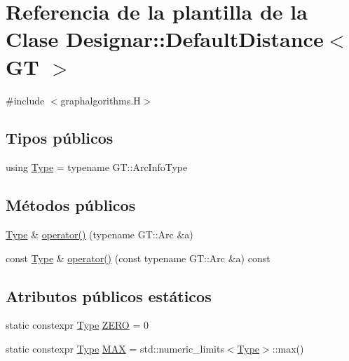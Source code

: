 \hypertarget{class_designar_1_1_default_distance}{}\section{Referencia de la plantilla de la Clase Designar\+:\+:Default\+Distance$<$ GT $>$}
\label{class_designar_1_1_default_distance}


{\ttfamily \#include $<$graphalgorithms.\+H$>$}

\subsection*{Tipos públicos}
\begin{DoxyCompactItemize}
\item 
using \hyperlink{class_designar_1_1_default_distance_a9317a5edf566779550b96edd532b502b}{Type} = typename G\+T\+::\+Arc\+Info\+Type
\end{DoxyCompactItemize}
\subsection*{Métodos públicos}
\begin{DoxyCompactItemize}
\item 
\hyperlink{class_designar_1_1_default_distance_a9317a5edf566779550b96edd532b502b}{Type} \& \hyperlink{class_designar_1_1_default_distance_ac601666aabb51229c4ceff72cd7d82db}{operator()} (typename G\+T\+::\+Arc \&a)
\item 
const \hyperlink{class_designar_1_1_default_distance_a9317a5edf566779550b96edd532b502b}{Type} \& \hyperlink{class_designar_1_1_default_distance_aeba8bd2867faf7d86dd0bcae6b690136}{operator()} (const typename G\+T\+::\+Arc \&a) const
\end{DoxyCompactItemize}
\subsection*{Atributos públicos estáticos}
\begin{DoxyCompactItemize}
\item 
static constexpr \hyperlink{class_designar_1_1_default_distance_a9317a5edf566779550b96edd532b502b}{Type} \hyperlink{class_designar_1_1_default_distance_abee3d9a2a3f573d6844c0a0fdbd4d7ac}{Z\+E\+RO} = 0
\item 
static constexpr \hyperlink{class_designar_1_1_default_distance_a9317a5edf566779550b96edd532b502b}{Type} \hyperlink{class_designar_1_1_default_distance_af1c417705ee2d66f828c0f872607a7ea}{M\+AX} = std\+::numeric\+\_\+limits$<$\hyperlink{class_designar_1_1_default_distance_a9317a5edf566779550b96edd532b502b}{Type}$>$\+::max()
\end{DoxyCompactItemize}


